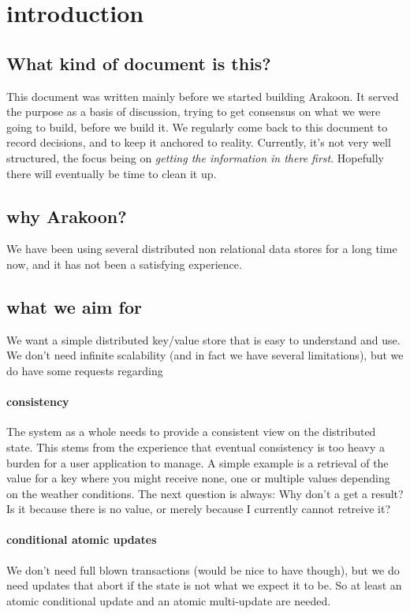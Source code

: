 \section{introduction}
\subsection{What kind of document is this?}
This document was written mainly before we started building Arakoon. 
It served the purpose as a basis of discussion, 
trying to get consensus on what we were going to build, before we build it. 
We regularly come back to this document to record decisions, and to keep it anchored to reality. 
Currently, it's not very well structured, the focus being on \emph{getting the information in there first}. 
Hopefully there will eventually be time to clean it up.
\subsection{why Arakoon?}
We have been using several distributed non relational data stores for a long time now, and it has not been a satisfying experience.
\subsection{what we aim for}
We want a simple distributed key/value store that is easy to understand and use.
We don't need infinite scalability (and in fact we have several limitations), but we do have some requests regarding
\paragraph{consistency}
The system as a whole needs to provide a consistent view on the distributed state.
This stems from the experience that eventual consistency is too heavy a burden for a user application to manage. 
A simple example is a retrieval of the value for a key where you might receive none, one or multiple values depending on the weather conditions. The next question is always: Why don't a get a result? Is it because there is no value, or merely because I currently cannot retreive it?

\paragraph{conditional atomic updates}
We don't need full blown transactions (would be nice to have though), 
but we do need updates that abort if the state is not what we expect it to be.
So at least an atomic conditional update and an atomic multi-update are needed.
